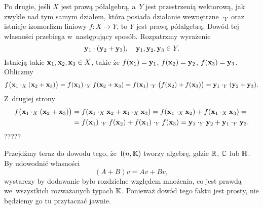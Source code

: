 \documentclass[a4paper,11pt]{article}
\begin{document}
Po drugie, jeśli $X$ jest prawą półalgebrą, a~$Y$ jest przestrzenią wektorową, jak zwykle nad tym samym działem, która posiada działanie wewnętrzne $\cdot_{ Y }$ oraz istnieje izomorfizm liniowy $f : X \to Y$, to $Y$ jest prawą półalgebrą. Dowód tej własności przebiega w~następujący sposób.
Rozpatrzmy wyrażenie
\begin{equation}
  \label{eq:Wojtynski-72}
  \mathbf{y}_{ 1 } \cdot ( \mathbf{y}_{ 2 } + \mathbf{y}_{ 3 } ), \quad
  \mathbf{y}_{ 1 }, \mathbf{y}_{ 2 }, \mathbf{y}_{ 3 } \in Y.
\end{equation}
Istnieją takie $\mathbf{x}_{ 1 }, \mathbf{x}_{ 2 }, \mathbf{x}_{ 3 } \in X$, takie że $f( \mathbf{x}_{ 1 } ) = \mathbf{y}_{ 1 }$, $f( \mathbf{x}_{ 2 } ) = \mathbf{y}_{ 2 }$, $f( \mathbf{x}_{ 3 } ) = \mathbf{y}_{ 3 }$. Obliczmy
\begin{equation}
  \label{eq:Wojtynski-73}
  f\big( \mathbf{x}_{ 1 }
  \cdot_{ X } ( \mathbf{x}_{ 2 } + \mathbf{x}_{ 3 } ) \big) =
  f( \mathbf{x}_{ 1 } ) \cdot_{ Y } f( \mathbf{x}_{ 2 } + \mathbf{x}_{ 3 } ) =
  f( \mathbf{x}_{ 1 } ) \cdot_{ Y } \big( f( \mathbf{x}_{ 2 } )
  + f( \mathbf{x}_{ 3 } ) \big) =
  \mathbf{y}_{ 1 } \cdot_{ Y } ( \mathbf{y}_{ 2 } + \mathbf{y}_{ 3 } ).
\end{equation}
Z~drugiej strony
\begin{equation}
  \label{eq:12}
  \begin{split}
    f\big( \mathbf{x}_{ 1 }
    \cdot_{ X } ( \mathbf{x}_{ 2 } + \mathbf{x}_{ 3 } ) \big)
    &=
      f( \mathbf{x}_{ 1 } \cdot_{ X } \mathbf{x}_{ 2 }
      + \mathbf{x}_{ 1 } \cdot_{ X } \mathbf{x}_{ 3 } ) =
      f( \mathbf{x}_{ 1 } \cdot_{ X } \mathbf{x}_{ 2 } )
      + f( \mathbf{x}_{ 1 } \cdot_{ X } \mathbf{x}_{ 3 } ) = \\
    &=
      f( \mathbf{x}_{ 1 } ) \cdot_{ Y } f( \mathbf{x}_{ 2 } )
      + f( \mathbf{x}_{ 1 } ) \cdot_{ Y } f( \mathbf{x}_{ 3 } ) =
      \mathbf{y}_{ 1 } \cdot_{ Y } \mathbf{y}_{ 2 }
      + \mathbf{y}_{ 1 } \cdot_{ Y } \mathbf{y}_{ 3 }.
  \end{split}
\end{equation}
?????


Przejdźmy teraz do dowodu tego, że~$\mathfrak{l}( n, \mathbb{K} )$ tworzy algebrę,
gdzie $\mathbb{R}$, $\mathbb{C}$ lub $\mathbb{H}$. By udowodnić własności
\begin{equation}
  \label{eq:Wojtynski-43}
  ( A + B ) v = A v + B v,
\end{equation}
wystarczy by dodawanie było rozdzielne względem mnożenia, co jest prawdą
we~wszystkich rozważanych typach $\mathbb{K}$. Ponieważ dowód tego faktu jest
prosty, nie będziemy go tu przytaczać jawnie.
\end{document}

